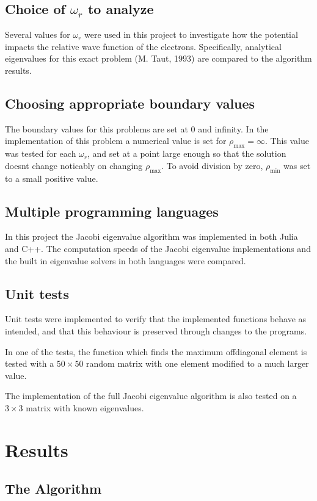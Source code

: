 \documentclass[aps,reprint]{revtex4-1}
\begin{document}
\subsection{Choice of $\omega_r$ to analyze}
Several values for $\omega_r$ were used in this project to investigate how the
potential impacts the relative wave function of the electrons. Specifically,
analytical eigenvalues for this exact problem (M. Taut, 1993) are compared
to the algorithm results.
\subsection{Choosing appropriate boundary values}
The boundary values for this problems are set at $0$ and infinity. In the
implementation of this problem a numerical value is set for $\rho_\text{max} = \infty$.
This value was tested for each $\omega_r$, and set at a point large enough
so that the solution doesnt change noticably on changing $\rho_\text{max}$.
To avoid division by zero, $\rho_\text{min}$ was set to a small positive value.
\subsection{Multiple programming languages}
In this project the Jacobi eigenvalue algorithm was implemented in both Julia and
C++. The computation speeds of the Jacobi eigenvalue implementations
and the built in eigenvalue solvers in both languages were compared.
\subsection{Unit tests}
Unit tests were implemented to verify that the implemented functions behave
as intended, and that this behaviour is preserved through changes to the programs.

In one of the tests, the function which finds the maximum offdiagonal element
is tested with a $50 \times 50$ random matrix with one element modified to a
much larger value.

The implementation of the full Jacobi eigenvalue algorithm is also tested on a
$3 \times 3$ matrix with known eigenvalues.
\section{Results}
\label{sec:results}

\subsection{The Algorithm}
\label{sec:algorithm}
\end{document}
